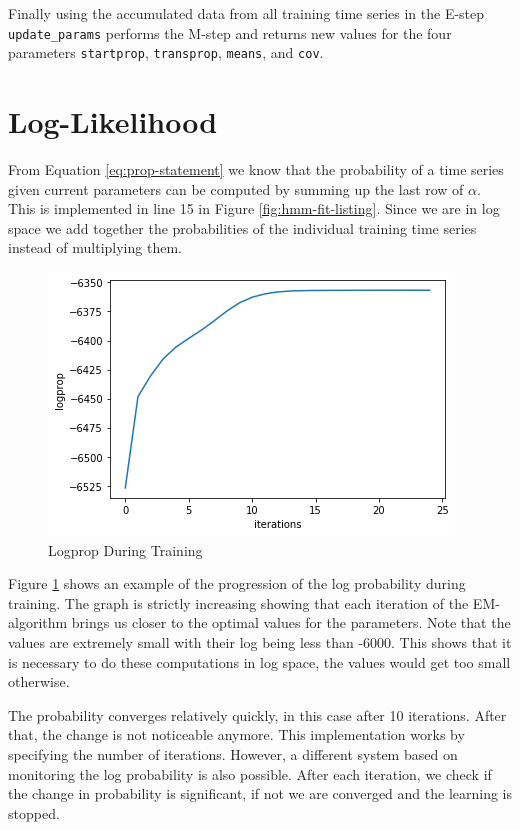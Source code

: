 Finally using the accumulated data from all training time series in the E-step \texttt{update\_params} performs the M-step and returns new values for the four parameters \texttt{startprop}, \texttt{transprop}, \texttt{means}, and \texttt{cov}.

\section{Log-Likelihood}

From Equation \eqref{eq:prop-statement} we know that the probability of a time series given current parameters can be computed by summing up the last row of $\alpha$. This is implemented in line 15 in Figure \ref{fig:hmm-fit-listing}. Since we are in log space we add together the probabilities of the individual training time series instead of multiplying them.

\begin{figure}
   \includegraphics{figures/logprop.png}
   \caption{Logprop During Training}
      
   \label{fig:lopprop-graph}
\end{figure}

Figure \ref{fig:lopprop-graph} shows an example of the progression of the log probability during training. The graph is strictly increasing showing that each iteration of the EM-algorithm brings us closer to the optimal values for the parameters. Note that the values are extremely small with their log being less than -6000. This shows that it is necessary to do these computations in log space, the values would get too small otherwise. 

The probability converges relatively quickly, in this case after 10 iterations. After that, the change is not noticeable anymore. This implementation works by specifying the number of iterations. However, a different system based on monitoring the log probability is also possible. After each iteration, we check if the change in probability is significant, if not we are converged and the learning is stopped.

